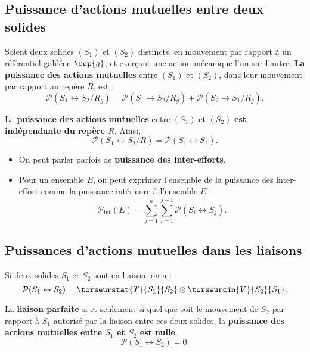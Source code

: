 \subsection{Puissance d'actions mutuelles entre deux solides}


\begin{defi}
Soient deux solides $(S_1)$ et $(S_2)$ distincts, en mouvement par rapport à un référentiel galiléen $\rep{g}$, et exerçant une action mécanique l'un sur l'autre.
\textbf{La puissance} \textbf{des actions mutuelles} entre $(S_1)$ et $(S_2)$, dans leur mouvement par rapport au repère $R$, est :
$$
\mathcal{P}(S_1 \leftrightarrow S_2/R_g)=\mathcal{P}(S_1 \rightarrow S_2/R_g)+\mathcal{P}(S_2 \rightarrow S_1/R_g).
$$		
 

La \textbf{puissance des actions mutuelles} entre $(S_1)$ et $(S_2)$ \textbf{est indépendante du repère $R$}.
Ainsi,
$$\mathcal{P}(S_1 \leftrightarrow S_2/R)=\mathcal{P}(S_1 \leftrightarrow S_2).
$$
\end{defi}


\begin{remarque}%
\begin{itemize}
\item On peut parler parfois de \textbf{puissance des inter-efforts}.
\item Pour un ensemble $E$, on peut exprimer l'ensemble de la puissance des inter-effort comme la puissance intérieure à l'ensemble $E$ : 
$$
\mathcal{P}_{\text{int}}(E)=\displaystyle{\sum^n_{j=1}}\displaystyle{\sum^{j-1}_{i=1}}\mathcal{P}(S_i \leftrightarrow S_j).
$$
\end{itemize}

\end{remarque}%


\subsection{Puissances d'actions mutuelles dans les liaisons}
\begin{defi}
Si deux solides $S_1$ et $S_2$ sont en liaison, on a :
$$
\mathcal{P}(S_1 \leftrightarrow S_2) = \torseurstat{T}{S_1}{S_2}\otimes \torseurcin{V}{S_2}{S_1}.
$$

La \textbf{liaison parfaite} si et seulement si quel que soit le mouvement de $S_2$ par rapport à $S_1$ autorisé par la liaison entre ces deux solides, la \textbf{puissance des actions mutuelles entre $S_1$ et $S_2$ est nulle}.
$$
\mathcal{P}(S_1 \leftrightarrow S_2)=0.
$$
\end{defi}


